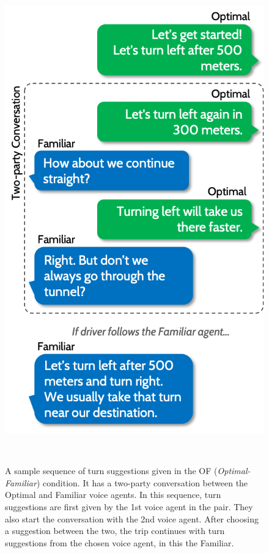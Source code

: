 \begin{figure}[h]
\centering
  \includegraphics[scale=0.5]{figures/s2-convo.png}
  \caption{A sample sequence of turn suggestions given in the OF (\textit{Optimal-Familiar}) condition. It has a two-party conversation between the Optimal and Familiar voice agents. In this sequence, turn suggestions are first given by the 1st voice agent in the pair. They also start the conversation with the 2nd voice agent. After choosing a suggestion between the two, the trip continues with turn suggestions from the chosen voice agent, in this the Familiar.}~\label{fig:s2-convo}
\end{figure}

